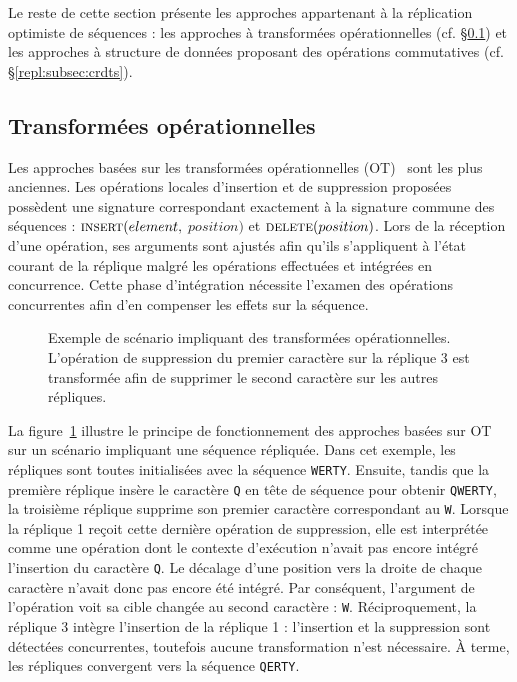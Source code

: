 Le reste de cette section présente les approches appartenant à la réplication
optimiste de séquences : les approches à transformées opérationnelles (cf.
§\ref{repl:subsec:ot}) et les approches à structure de données proposant des
opérations commutatives (cf. §\ref{repl:subsec:crdts}).

\subsection{Transformées opérationnelles}
\label{repl:subsec:ot}

Les approches basées sur les transformées opérationnelles
(OT)~\cite{sun1998operational, sun2009contextbased} sont les plus anciennes. Les
opérations locales d'insertion et de suppression proposées possèdent une
signature correspondant exactement à la signature commune des séquences :
$\textsc{insert}(element,$ $position)$ et $\textsc{delete}(position)$. Lors de
la réception d'une opération, ses arguments sont ajustés afin qu'ils
s'appliquent à l'état courant de la réplique malgré les opérations effectuées et
intégrées en concurrence. Cette phase d'intégration nécessite l'examen des
opérations concurrentes afin d'en compenser les effets sur la séquence.


\begin{figure}
  \centering
  
  \caption[Exemple de transformées opérationnelles] {\label{repl:fig:otexample}
    Exemple de scénario impliquant des transformées opérationnelles. L'opération
    de suppression du premier caractère sur la réplique 3 est transformée afin
    de supprimer le second caractère sur les autres répliques.}
\end{figure}

La figure~\ref{repl:fig:otexample} illustre le principe de fonctionnement des
approches basées sur OT sur un scénario impliquant une séquence répliquée. Dans
cet exemple, les répliques sont toutes initialisées avec la séquence
\texttt{WERTY}. Ensuite, tandis que la première réplique insère le caractère
\texttt{Q} en tête de séquence pour obtenir \texttt{QWERTY}, la troisième
réplique supprime son premier caractère correspondant au \texttt{W}. Lorsque la
réplique 1 reçoit cette dernière opération de suppression, elle est interprétée
comme une opération dont le contexte d'exécution n'avait pas encore intégré
l'insertion du caractère \texttt{Q}. Le décalage d'une position vers la droite
de chaque caractère n'avait donc pas encore été intégré. Par conséquent,
l'argument de l'opération voit sa cible changée au second caractère :
\texttt{W}.  Réciproquement, la réplique 3 intègre l'insertion de la réplique 1
: l'insertion et la suppression sont détectées concurrentes, toutefois aucune
transformation n'est nécessaire. À terme, les répliques convergent vers la
séquence \texttt{QERTY}. %

